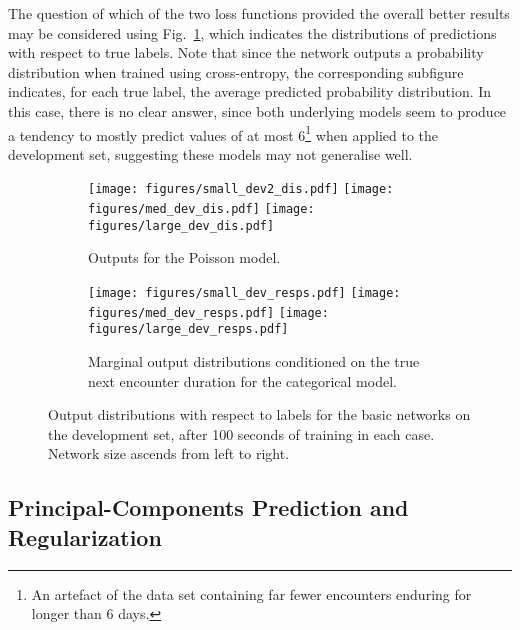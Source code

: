 \documentclass[10pt, twoside, a4paper]{article}
\begin{document}
	The question of which of the two loss functions provided the overall better results may be 
	considered using Fig.\ \ref{fig:responsibilities}, which indicates the distributions of 
	predictions with respect to true labels. Note that since the network outputs a probability distribution when trained 
	using cross-entropy, the corresponding subfigure indicates, for each true label, the average
	predicted probability distribution. In this case, there is no clear answer, since both 
	underlying models seem to produce a tendency to mostly predict values of at most 6\footnote{An artefact of the data set containing far fewer encounters enduring for longer than 6 days.}
	when applied to the development set, suggesting these models may not generalise well.
	\begin{figure}
	\begin{subfigure}[b]{17cm}
	\texttt{[image: figures/small\_dev2\_dis.pdf]}
	\texttt{[image: figures/med\_dev\_dis.pdf]}
	\texttt{[image: figures/large\_dev\_dis.pdf]}
	\caption{Outputs for the Poisson model.}
	\end{subfigure}
	\begin{subfigure}[b]{17cm}
	\texttt{[image: figures/small\_dev\_resps.pdf]}
	\texttt{[image: figures/med\_dev\_resps.pdf]}
	\texttt{[image: figures/large\_dev\_resps.pdf]}
	\caption{Marginal output distributions conditioned on the true next encounter duration for 
	the categorical model.}
	\end{subfigure}
	\caption{Output distributions with respect to labels for the basic networks on the 
	development set, after 100 seconds of training in each case. Network size ascends from 
	left to right.}
	\label{fig:responsibilities}
	\end{figure}

	\subsection{Principal-Components Prediction and Regularization}
\end{document}
